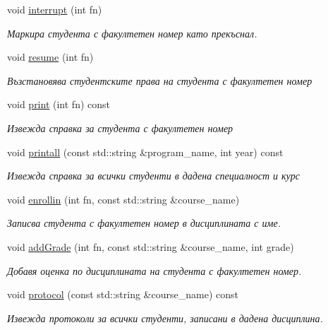 \begin{DoxyCompactItemize}
void \hyperlink{class_susi_af0dc551bdb5927df3cf961cf90768566}{interrupt} (int fn)
\begin{DoxyCompactList}\small\item\em Маркира студента с факултетен номер като прекъснал. \end{DoxyCompactList}\item 
void \hyperlink{class_susi_a2294098afce61489563ac5fd9dea79ff}{resume} (int fn)
\begin{DoxyCompactList}\small\item\em Възстановява студентските права на студента с факултетен номер \end{DoxyCompactList}\item 
void \hyperlink{class_susi_a130c33e1b520a6f06b876b5b547bb11b}{print} (int fn) const
\begin{DoxyCompactList}\small\item\em Извежда справка за студента с факултетен номер \end{DoxyCompactList}\item 
void \hyperlink{class_susi_a36287fc59b1d361e4f868eec9eb9771d}{printall} (const std\+::string \&program\+\_\+name, int year) const
\begin{DoxyCompactList}\small\item\em Извежда справка за всички студенти в дадена специалност и курс \end{DoxyCompactList}\item 
void \hyperlink{class_susi_a7d5a18086b8060430995f8de865399a8}{enrollin} (int fn, const std\+::string \&course\+\_\+name)
\begin{DoxyCompactList}\small\item\em Записва студента с факултетен номер в дисциплината с име. \end{DoxyCompactList}\item 
void \hyperlink{class_susi_a733754f4b69ee279041fe94d2b67b310}{add\+Grade} (int fn, const std\+::string \&course\+\_\+name, int grade)
\begin{DoxyCompactList}\small\item\em Добавя оценка по дисциплината на студента с факултетен номер. \end{DoxyCompactList}\item 
void \hyperlink{class_susi_a9e563066928e033a73124ee235b51d26}{protocol} (const std\+::string \&course\+\_\+name) const
\begin{DoxyCompactList}\small\item\em Извежда протоколи за всички студенти, записани в дадена дисциплина. \end{DoxyCompactList}\item 

\end{DoxyCompactItemize}
